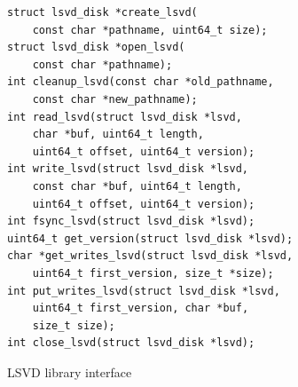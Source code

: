\lstset{language=C}
\lstset{basicstyle=\small}
\lstset{frame=tlrb}
\begin{figure}
\begin{lstlisting}
struct lsvd_disk *create_lsvd(
	const char *pathname, uint64_t size);
struct lsvd_disk *open_lsvd(
	const char *pathname);
int cleanup_lsvd(const char *old_pathname, 
	const char *new_pathname);
int read_lsvd(struct lsvd_disk *lsvd,
	char *buf, uint64_t length,
	uint64_t offset, uint64_t version);
int write_lsvd(struct lsvd_disk *lsvd,
	const char *buf, uint64_t length, 
	uint64_t offset, uint64_t version);
int fsync_lsvd(struct lsvd_disk *lsvd);
uint64_t get_version(struct lsvd_disk *lsvd);
char *get_writes_lsvd(struct lsvd_disk *lsvd, 
	uint64_t first_version, size_t *size);
int put_writes_lsvd(struct lsvd_disk *lsvd, 
	uint64_t first_version, char *buf,
	size_t size);
int close_lsvd(struct lsvd_disk *lsvd);
\end{lstlisting}
\caption{LSVD library interface}
\label{fig:lsvdinterface}
\end{figure}
